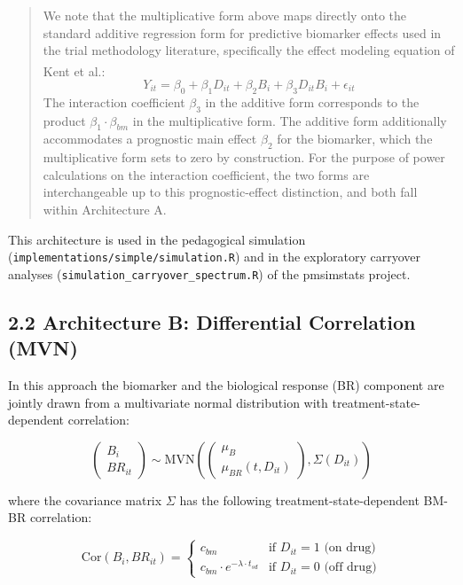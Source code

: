 \documentclass[
  11pt,
]{article}
\newenvironment{orig}{%
  \begin{quote}\normalsize\color[gray]{0.55}}{%
  \end{quote}}
\begin{document}
\begin{orig}
We note that the multiplicative form above maps directly onto the
standard additive regression form for predictive biomarker effects used
in the trial methodology literature, specifically the effect modeling
equation of Kent et al.\textsuperscript{}:
\[Y_{it} = \beta_0 + \beta_1 D_{it} + \beta_2 B_i + \beta_3
D_{it} B_i + \epsilon_{it}\] The interaction coefficient \(\beta_3\) in
the additive form corresponds to the product
\(\beta_1 \cdot \beta_{bm}\) in the multiplicative form. The additive
form additionally accommodates a prognostic main effect \(\beta_2\) for
the biomarker, which the multiplicative form sets to zero by
construction. For the purpose of power calculations on the interaction
coefficient, the two forms are interchangeable up to this
prognostic-effect distinction, and both fall within Architecture A.

\end{orig}

This architecture is used in the pedagogical simulation
(\texttt{implementations/simple/simulation.R}) and in the exploratory
carryover analyses (\texttt{simulation\_carryover\_spectrum.R}) of the
pmsimstats project.

\subsection{2.2 Architecture B: Differential Correlation (MVN)}

In this approach the biomarker and the biological response (BR)
component are jointly drawn from a multivariate normal distribution with
treatment-state-dependent correlation:

\[\begin{pmatrix} B_i \\ BR_{it} \end{pmatrix} \sim
\text{MVN}\left(\begin{pmatrix} \mu_B \\ \mu_{BR}(t, D_{it})
\end{pmatrix}, \Sigma(D_{it})\right)\]

where the covariance matrix \(\Sigma\) has the following
treatment-state-dependent BM-BR correlation:

\[\text{Cor}(B_i, BR_{it}) = \begin{cases}
c_{bm} & \text{if } D_{it} = 1 \text{ (on drug)} \\
c_{bm} \cdot e^{-\lambda \cdot t_{sd}} &
\text{if } D_{it} = 0 \text{ (off drug)}
\end{cases}\]
\end{document}
